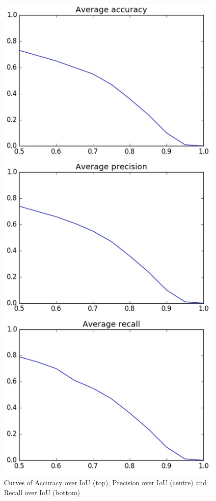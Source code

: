 \begin{figure}
    \centering
    \includegraphics[scale=0.5]{img/segmentation_overlap.jpg}
    \caption{Curves of Accuracy over IoU (top), Precision over IoU (centre) and Recall over IoU (bottom)}
    \label{fig:segmentation_overlap}
\end{figure}

